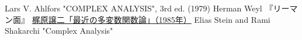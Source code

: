 \documentclass[uplatex, dvipdfmx]{jsreport}
\begin{document}
\begin{definition}
    
\end{definition}

\begin{thebibliography}{99}
    Lars V. Ahlfors "COMPLEX ANALYSIS", 3rd ed. (1979)
    Herman Weyl 『リーマン面』
    \href{https://www.jstage.jst.go.jp/article/sugaku1947/38/3/38_3_270/_pdf}{梶原譲二「最近の多変数関数論」（1985年）}
    Elias Stein and Rami Shakarchi "Complex Analysis"
\end{thebibliography}
\end{document}
